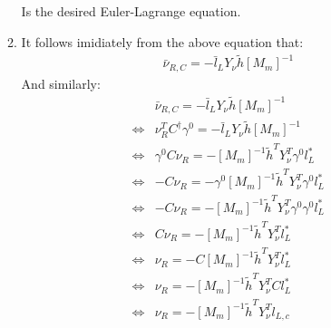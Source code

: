 \documentclass[12pt,a4]{article}
\begin{document}
\begin{enumerate}
\begin{enumerate}
        Is the desired Euler-Lagrange equation.
      \item
        It follows imidiately from the above equation that:
        \begin{align*}
          \bar{\nu}_{R,C} = -\bar{l}_L Y_\nu \tilde{h} [M_m ]^{-1}
        \end{align*}
        And similarly:
        \begin{align*}
                          & \bar{\nu}_{R,C} = -\bar{l}_L Y_\nu \tilde{h} [M_m ]^{-1}\\
          \Leftrightarrow & \nu_R^T C^\dagger \gamma^0 = -\bar{l}_L Y_\nu \tilde{h} [M_m ]^{-1}\\
          \Leftrightarrow & \gamma^0 C \nu_R = -  [M_m ]^{-1} \tilde{h}^T Y_\nu^T \gamma^0 l_L^*\\
          \Leftrightarrow &  - C \nu_R = - \gamma^0 [M_m ]^{-1} \tilde{h}^T Y_\nu^T \gamma^0 l_L^*\\
          \Leftrightarrow &  - C \nu_R = -  [M_m ]^{-1} \tilde{h}^T Y_\nu^T \gamma^0 \gamma^0 l_L^*\\
          \Leftrightarrow &   C \nu_R =  - [M_m ]^{-1} \tilde{h}^T Y_\nu^T  l_L^*\\
          \Leftrightarrow &    \nu_R =  - C [M_m ]^{-1} \tilde{h}^T Y_\nu^T  l_L^*\\
          \Leftrightarrow &    \nu_R =  -  [M_m ]^{-1} \tilde{h}^T Y_\nu^T  C l_L^*\\
          \Leftrightarrow &    \nu_R =  -  [M_m ]^{-1} \tilde{h}^T Y_\nu^T  l_{L, c}

\end{align*}
\end{enumerate}
\end{enumerate}
\end{document}
